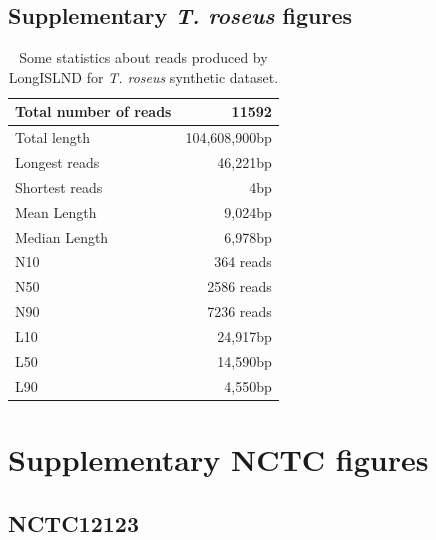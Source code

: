 \documentclass[./main.tex]{subfiles}
\begin{document}
\subsection*{Supplementary {\sl T. roseus} figures} 
\begin{table}[!hb]
\centering
\begin{tabular}{lr}
\hline
Total number of reads & 11592 \\
\hline
Total length & 104,608,900bp \\
\hline
Longest reads & 46,221bp \\
Shortest reads & 4bp \\
Mean Length & 9,024bp \\
Median Length & 6,978bp \\
\hline
N10 & 364 reads \\
N50 & 2586 reads \\
N90 & 7236 reads \\
\hline
L10 & 24,917bp \\
L50 & 14,590bp \\
L90 & 4,550bp \\
\hline
\end{tabular}
\caption{Some statistics about reads produced by LongISLND for \textit{T. roseus} synthetic dataset.}
\label{tb:appendix:t_roseus_20x}
\end{table}


\newpage

\section{Supplementary NCTC figures}



\subsection*{NCTC12123}
\end{document}
